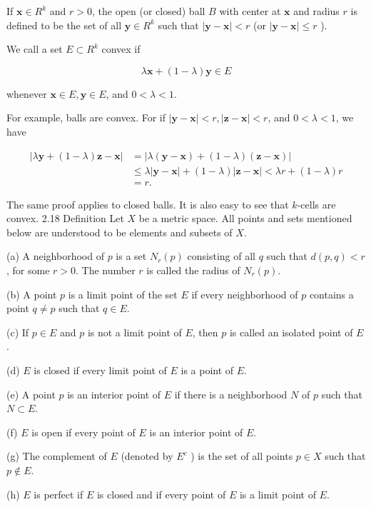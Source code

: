 \documentclass[10pt]{article}
\begin{document}
If $\mathbf{x} \in R^{k}$ and $r>0$, the open (or closed) ball $B$ with center at $\mathbf{x}$ and radius $r$ is defined to be the set of all $\mathbf{y} \in R^{k}$ such that $|\mathbf{y}-\mathbf{x}|<r$ (or $|\mathbf{y}-\mathbf{x}| \leq r$ ).

We call a set $E \subset R^{k}$ convex if

$$
\lambda \mathbf{x}+(1-\lambda) \mathbf{y} \in E
$$

whenever $\mathbf{x} \in E, \mathbf{y} \in E$, and $0<\lambda<1$.

For example, balls are convex. For if $|\mathbf{y}-\mathbf{x}|<r,|\mathbf{z}-\mathbf{x}|<r$, and $0<\lambda<1$, we have

$$
\begin{aligned}
|\lambda \mathbf{y}+(1-\lambda) \mathbf{z}-\mathbf{x}| & =|\lambda(\mathbf{y}-\mathbf{x})+(1-\lambda)(\mathbf{z}-\mathbf{x})| \\
& \leq \lambda|\mathbf{y}-\mathbf{x}|+(1-\lambda)|\mathbf{z}-\mathbf{x}|<\lambda r+(1-\lambda) r \\
& =r .
\end{aligned}
$$

The same proof applies to closed balls. It is also easy to see that $k$-cells are convex. 2.18 Definition Let $X$ be a metric space. All points and sets mentioned below are understood to be elements and subsets of $X$.

(a) A neighborhood of $p$ is a set $N_{r}(p)$ consisting of all $q$ such that $d(p, q)<r$, for some $r>0$. The number $r$ is called the radius of $N_{r}(p)$.

(b) A point $p$ is a limit point of the set $E$ if every neighborhood of $p$ contains a point $q \neq p$ such that $q \in E$.

(c) If $p \in E$ and $p$ is not a limit point of $E$, then $p$ is called an isolated point of $E$.

(d) $E$ is closed if every limit point of $E$ is a point of $E$.

(e) A point $p$ is an interior point of $E$ if there is a neighborhood $N$ of $p$ such that $N \subset E$.

(f) $E$ is open if every point of $E$ is an interior point of $E$.

(g) The complement of $E$ (denoted by $E^{c}$ ) is the set of all points $p \in X$ such that $p \notin E$.

(h) $E$ is perfect if $E$ is closed and if every point of $E$ is a limit point of $E$.
\end{document}
